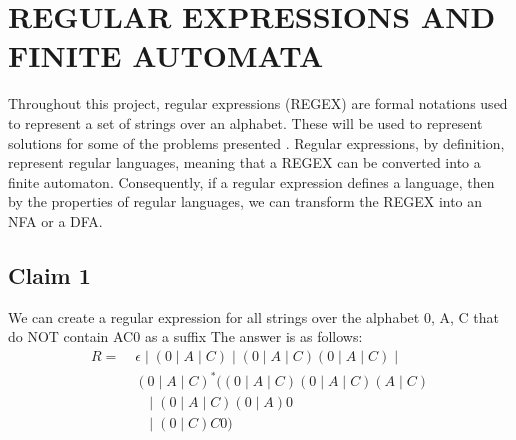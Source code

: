 \documentclass[sigconf,anonymous,review]{acmart}
\begin{document}
\section{REGULAR EXPRESSIONS AND FINITE AUTOMATA}
Throughout this project, regular expressions (REGEX) are formal notations used to represent a set of strings over an alphabet. These will be used to represent solutions for some of the problems presented \cite{sipser_introduction_2013}. Regular expressions, by definition, represent regular languages, meaning that a REGEX can be converted into a finite automaton. Consequently, if a regular expression defines a language, then by the properties of regular languages, we can transform the REGEX into an NFA or a DFA.

\subsection{Claim 1}
 We can create a regular expression for all strings over the alphabet {0, A, C} that do NOT contain AC0 as a suffix
The answer is as follows:
\begin{align*}
    R = &\; \epsilon \; | \; (0 \mid A \mid C) \; | \; (0 \mid A \mid C)(0 \mid A \mid C) \; | \\
        &\; (0 \mid A \mid C)^* \Big( (0 \mid A \mid C)(0 \mid A \mid C)(A \mid C) \\
        &\quad \; \Big| \; (0 \mid A \mid C)(0 \mid A) 0 \\
        &\quad \; \Big| \; (0 \mid C) C0 \Big)
\end{align*}
\end{document}
